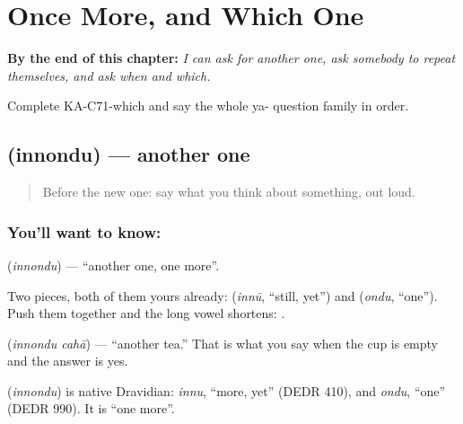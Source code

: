 
\chapter{Once More, and Which One}
\label{ch:ka-once-more}

\begin{chapteropening}
\textbf{By the end of this chapter:} \emph{I can ask for another one, ask somebody to repeat themselves, and ask when and which.}

Complete KA-C71-which and say the whole ya- question family in order.
\end{chapteropening}

\section[\texorpdfstring{\kn{ಇನ್ನೊಂದು} (innondu)}{ಇನ್ನೊಂದು (innondu)}]{ (innondu) — another one}

\label{lesson:KA-C71-another}



\begin{quote}
Before the new one: say what you think about something, out loud.
\end{quote}

\subsection*{You'll want to know: }
\textbf{} (\emph{innondu}) — \textquotedblleft{}another one, one more\textquotedblright{}.

Two pieces, both of them yours already:  (\emph{innū}, \textquotedblleft{}still, yet\textquotedblright{}) and  (\emph{ondu}, \textquotedblleft{}one\textquotedblright{}). Push them together and the long vowel shortens: .

\textbf{ } (\emph{innondu cahā}) — \textquotedblleft{}another tea.\textquotedblright{} That is what you say when the cup is empty and the answer is yes.

\begin{cousinweb}
\textbf{} (\emph{innondu}) is native Dravidian: \emph{innu}, \textquotedblleft{}more, yet\textquotedblright{} (DEDR 410), and \emph{ondu}, \textquotedblleft{}one\textquotedblright{} (DEDR 990). It is \textquotedblleft{}one more\textquotedblright{}.
\end{cousinweb}


